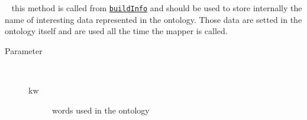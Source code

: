 \begin{description}
~ this method is called from \texttt{\hyperlink{ontologyFramework.OFDataMapping.OFDataMapperBuilder.buildInfo(java.lang.String[],ontologyFramework.OFContextManagement.OWLReferences,ontologyFramework.OFRunning.OFInvokingManager.OFBuildedListInvoker)}{buildInfo}}
 and should be used to store internally the name of interesting
 data represented in the ontology. Those data are setted in the
 ontology itself and are used all the time the mapper is called.
\begin{description}
\item[Parameter] ~
\begin{description}
\item[kw]
words used in the ontology
\end{description}
\end{description}
\end{description}
